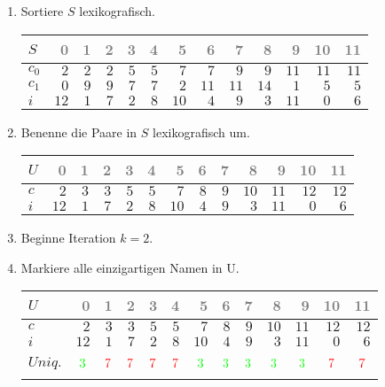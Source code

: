 \begin{enumerate}
\item 
Sortiere $S$ lexikografisch.
\begin{center}
\small\begin{tabular}{lrrrrrrrrrrrr}
    \toprule 
    $S$ & \textcolor{gray}{0} & \textcolor{gray}{1} & \textcolor{gray}{2} & \textcolor{gray}{3} & \textcolor{gray}{4} & \textcolor{gray}{5} & \textcolor{gray}{6} & \textcolor{gray}{7} & \textcolor{gray}{8} & \textcolor{gray}{9} & \textcolor{gray}{10} & \textcolor{gray}{11}\\
    \midrule 
    $c_0$ & $2$ & $2$ & $2$ & $5$ & $5$ & $7$ & $7$ & $9$ & $9$ & $11$ & $11$ & $11$ \\
    $c_1$ & $0$ & $9$ & $9$ & $7$ & $7$ & $2$ & $11$ & $11$ & $14$ & $1$ & $5$ & $5$ \\
    $i$ & $12$ & $1$ & $7$ & $2$ & $8$ & $10$ & $4$ & $9$ & $3$ & $11$ & $0$ & $6$ \\
    \bottomrule 
\end{tabular}
\end{center}

\item 
Benenne die Paare in $S$ lexikografisch um.
\begin{center}
\small\begin{tabular}{lrrrrrrrrrrrr}
    \toprule 
    $U$ & \textcolor{gray}{0} & \textcolor{gray}{1} & \textcolor{gray}{2} & \textcolor{gray}{3} & \textcolor{gray}{4} & \textcolor{gray}{5} & \textcolor{gray}{6} & \textcolor{gray}{7} & \textcolor{gray}{8} & \textcolor{gray}{9} & \textcolor{gray}{10} & \textcolor{gray}{11}\\
    \midrule 
    $c$ & $2$ & $3$ & $3$ & $5$ & $5$ & $7$ & $8$ & $9$ & $10$ & $11$ & $12$ & $12$ \\
    $i$ & $12$ & $1$ & $7$ & $2$ & $8$ & $10$ & $4$ & $9$ & $3$ & $11$ & $0$ & $6$ \\
    \bottomrule 
\end{tabular}
\end{center}
\item 
Beginne Iteration $k = 2$.

\item 
Markiere alle einzigartigen Namen in U.
\begin{center}
\small\begin{tabular}{lrrrrrrrrrrrr}
    \toprule 
    $U$ & \textcolor{gray}{0} & \textcolor{gray}{1} & \textcolor{gray}{2} & \textcolor{gray}{3} & \textcolor{gray}{4} & \textcolor{gray}{5} & \textcolor{gray}{6} & \textcolor{gray}{7} & \textcolor{gray}{8} & \textcolor{gray}{9} & \textcolor{gray}{10} & \textcolor{gray}{11}\\
    \midrule 
    $c$ & $2$ & $3$ & $3$ & $5$ & $5$ & $7$ & $8$ & $9$ & $10$ & $11$ & $12$ & $12$ \\
    $i$ & $12$ & $1$ & $7$ & $2$ & $8$ & $10$ & $4$ & $9$ & $3$ & $11$ & $0$ & $6$ \\
    $Uniq.$ & $$\cmarkc$$ & $$\xmarkc$$ & $$\xmarkc$$ & $$\xmarkc$$ & $$\xmarkc$$ & $$\cmarkc$$ & $$\cmarkc$$ & $$\cmarkc$$ & $$\cmarkc$$ & $$\cmarkc$$ & $$\xmarkc$$ & $$\xmarkc$$ \\
    \bottomrule 
\end{tabular}
\end{center}


\end{enumerate}
